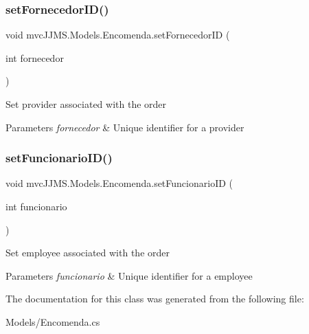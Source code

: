 \subsubsection{\texorpdfstring{set\+Fornecedor\+I\+D()}{setFornecedorID()}}
{\footnotesize\ttfamily void mvc\+J\+J\+M\+S.\+Models.\+Encomenda.\+set\+Fornecedor\+ID (\begin{DoxyParamCaption}\item[{int}]{fornecedor }\end{DoxyParamCaption})\hspace{0.3cm}{\ttfamily [inline]}}



Set provider associated with the order 


\begin{DoxyParams}{Parameters}
{\em fornecedor} & Unique identifier for a provider\\
\hline
\end{DoxyParams}
\mbox{\label{classmvc_j_j_m_s_1_1_models_1_1_encomenda_a63d79d71a12b1be75aa9a32d4ff41521}} 
\subsubsection{\texorpdfstring{set\+Funcionario\+I\+D()}{setFuncionarioID()}}
{\footnotesize\ttfamily void mvc\+J\+J\+M\+S.\+Models.\+Encomenda.\+set\+Funcionario\+ID (\begin{DoxyParamCaption}\item[{int}]{funcionario }\end{DoxyParamCaption})\hspace{0.3cm}{\ttfamily [inline]}}



Set employee associated with the order 


\begin{DoxyParams}{Parameters}
{\em funcionario} & Unique identifier for a employee\\
\hline
\end{DoxyParams}


The documentation for this class was generated from the following file\+:\begin{DoxyCompactItemize}
\item 
Models/Encomenda.\+cs\end{DoxyCompactItemize}
